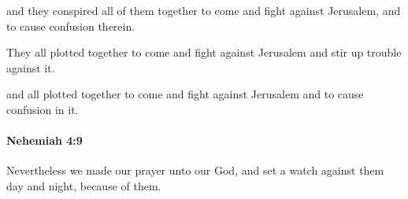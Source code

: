 			\begin{versebox}
					\item[BHS] 
					\item[LXX] 
					\item[ASV] and they conspired all of them together to come and fight against Jerusalem, and to cause confusion therein.
					\item[NIV] They all plotted together to come and fight against Jerusalem and stir up trouble against it.
					\item[NRSV] and all plotted together to come and fight against Jerusalem and to cause confusion in it.
			\end{versebox}

		\paragraph{Nehemiah 4:9} %
			\label{NEHEMIAH-4-9}

			Nevertheless we made our prayer unto our God, and set a watch against them day and night, because of them.

